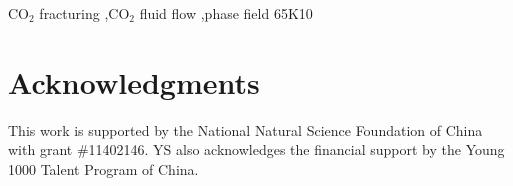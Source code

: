 \documentclass{elsarticle}
\begin{document}
\begin{frontmatter}
\begin{keyword}
CO$_2$ fracturing \sep  CO$_2$ fluid flow \sep  phase field
\MSC[2010] 65K10
\end{keyword}

\end{frontmatter}

\linenumbers






%


%
\clearpage
\appendix




\section*{Acknowledgments}
  This work is supported by the National Natural Science Foundation of China with grant \#11402146. YS also acknowledges the financial support by the Young 1000 Talent Program of China.


\end{document}
